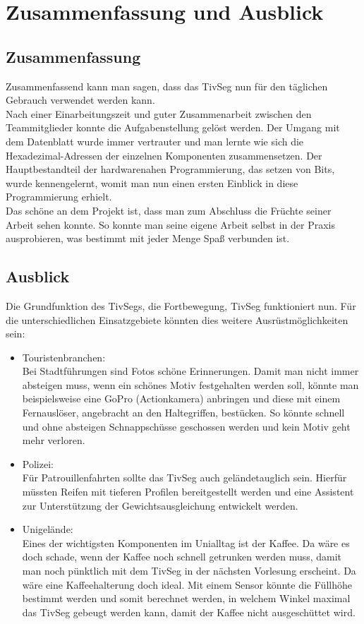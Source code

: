 \documentclass[a4paper,10pt,twoside]{report}
\begin{document}
\chapter{Zusammenfassung und Ausblick}
\section{Zusammenfassung}
Zusammenfassend kann man sagen, dass das TivSeg nun für den täglichen Gebrauch verwendet werden kann.\\ Nach einer Einarbeitungszeit und guter Zusammenarbeit zwischen den Teammitglieder konnte die Aufgabenstellung gelöst werden. Der Umgang mit dem Datenblatt wurde immer vertrauter und man lernte wie sich die Hexadezimal-Adressen der einzelnen Komponenten zusammensetzen. Der Hauptbestandteil der hardwarenahen Programmierung, das setzen von Bits, wurde kennengelernt, womit man nun einen ersten Einblick in diese Programmierung erhielt.\\
Das schöne an dem Projekt ist, dass man zum Abschluss die Früchte seiner Arbeit sehen konnte. So konnte man seine eigene Arbeit selbst in der Praxis ausprobieren, was bestimmt mit jeder Menge Spaß verbunden ist.    

\section{Ausblick}
Die Grundfunktion des TivSegs, die Fortbewegung, TivSeg funktioniert nun. Für die unterschiedlichen Einsatzgebiete könnten dies weitere Ausrüstmöglichkeiten sein:
\begin{itemize}
\item Touristenbranchen:\\
Bei Stadtführungen sind Fotos schöne Erinnerungen. Damit man nicht immer absteigen muss, wenn ein schönes Motiv festgehalten werden soll, könnte man beispielsweise eine GoPro (Actionkamera) anbringen und diese mit einem Fernauslöser, angebracht an den Haltegriffen, bestücken. So könnte schnell und ohne absteigen Schnappschüsse geschossen werden und kein Motiv geht mehr verloren.
\item Polizei: \\
Für Patrouillenfahrten sollte das TivSeg auch geländetauglich sein. Hierfür müssten Reifen mit tieferen Profilen bereitgestellt werden und eine Assistent zur Unterstützung der Gewichtsausgleichung entwickelt werden.
\item Unigelände:\\
Eines der wichtigsten Komponenten im Unialltag ist der Kaffee. Da wäre es doch schade, wenn der Kaffee noch schnell getrunken werden muss, damit man noch pünktlich mit dem TivSeg in der nächsten Vorlesung erscheint. Da wäre eine Kaffeehalterung doch ideal. Mit einem Sensor könnte die Füllhöhe bestimmt werden und somit berechnet werden, in welchem Winkel maximal das TivSeg gebeugt werden kann, damit der Kaffee nicht ausgeschüttet wird. 
\end{itemize}  
\nocite{*}


\end{document}

